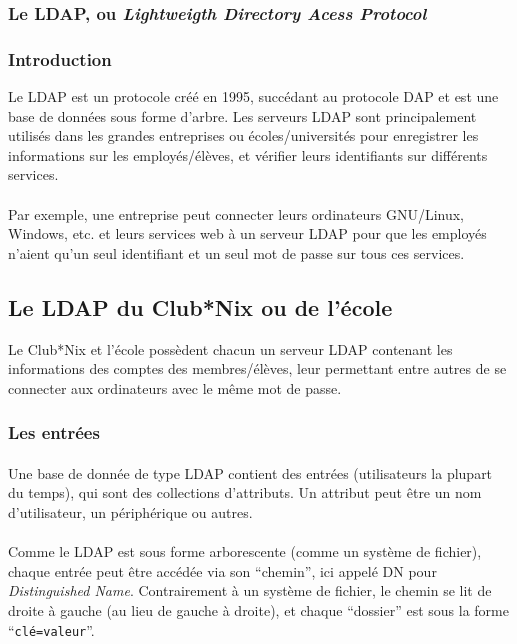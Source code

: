 \subsubsection*{Le LDAP, ou \textit{Lightweigth Directory Acess Protocol}}

\subsubsection*{Introduction}

Le LDAP est un protocole créé en 1995, succédant au protocole DAP et est une
base de données sous forme d'arbre. Les serveurs LDAP sont principalement
utilisés dans les grandes entreprises ou écoles/universités pour enregistrer
les informations sur les employés/élèves, et vérifier leurs identifiants sur
différents services.

\paragraph{} Par exemple, une entreprise peut connecter leurs ordinateurs
GNU/Linux, Windows, etc. et leurs services web à un serveur LDAP pour que les
employés n'aient qu'un seul identifiant et un seul mot de passe sur tous ces
services.

\subsection{Le LDAP du Club*Nix ou de l'école}

Le Club*Nix et l'école possèdent chacun un serveur LDAP contenant les
informations des comptes des membres/élèves, leur permettant entre autres de se
connecter aux ordinateurs avec le même mot de passe.

\subsubsection*{Les entrées}

\paragraph{} Une base de donnée de type LDAP contient des entrées (utilisateurs la plupart
du temps), qui sont des collections d'attributs. Un attribut peut être un nom
d'utilisateur, un périphérique ou autres.

\paragraph{} Comme le LDAP est sous forme arborescente (comme un système de
fichier), chaque entrée peut être accédée via son ``chemin'', ici appelé DN
pour \textit{Distinguished Name}. Contrairement à un
système de fichier, le chemin se lit de droite à gauche (au lieu de gauche à
droite), et chaque ``dossier'' est sous la forme ``\texttt{clé=valeur}''.

